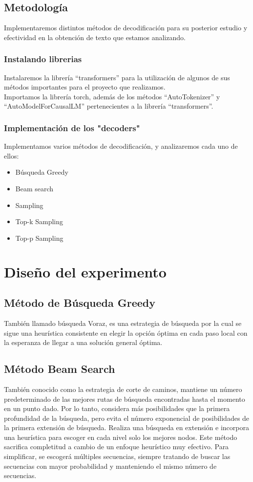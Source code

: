 \documentclass[10pt,twocolumn]{article}
\theoremstyle{definition}
\begin{document}
\subsection{Metodología}
Implementaremos distintos métodos de decodificación para su posterior estudio y efectividad en la obtención de texto que estamos analizando.
\subsubsection{Instalando librerias}
Instalaremos la librería “transformers” para la utilización de algunos de sus métodos importantes para el proyecto que realizamos.\\
Importamos la librería torch, además de los métodos “AutoTokenizer” y “AutoModelForCausalLM” pertenecientes a la librería “transformers”.
\subsubsection{Implementación de los "decoders"}
Implementamos varios métodos de decodificación, y analizaremos cada uno de ellos:
\begin{itemize}
    \item Búsqueda Greedy
    \item Beam search
    \item Sampling   
    \item Top-k Sampling  
    \item Top-p Sampling  
\end{itemize}

\section{Diseño del experimento}


\subsection{Método de Búsqueda Greedy}
También llamado búsqueda Voraz, es una estrategia de búsqueda por la cual se sigue una heurística consistente en elegir la opción óptima en cada paso local con la esperanza de llegar a una solución general óptima.

\subsection{Método Beam Search}
También conocido como la estrategia de corte de caminos, mantiene un número predeterminado de las mejores rutas de búsqueda encontradas hasta el momento en un punto dado. Por lo tanto, considera más posibilidades que la primera profundidad de la búsqueda, pero evita el número exponencial de posibilidades de la primera extensión de búsqueda.
Realiza una búsqueda en extensión e incorpora una heurística para escoger en cada nivel solo los mejores nodos. Este método sacrifica completitud a cambio de un enfoque heurístico muy efectivo. Para simplificar, se escogerá múltiples secuencias, siempre tratando de buscar las secuencias con mayor probabilidad y manteniendo el mismo número de secuencias.
\end{document}
